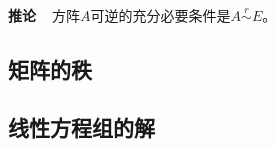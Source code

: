 \paragraph{}
\textbf{推论~~}方阵$A$可逆的充分必要条件是$A\overset{r}{\sim}E$。

\subsection{矩阵的秩}
\paragraph{}

\subsection{线性方程组的解}
\paragraph{}
